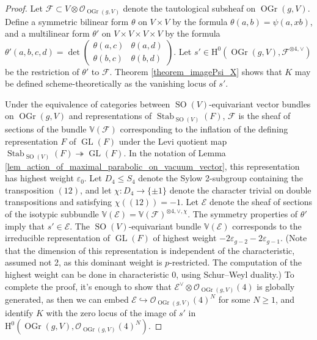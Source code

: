 \documentclass{article} %
\numberwithin{equation}{section}
\DeclareMathOperator{\GL}{GL}
\DeclareMathOperator{\SO}{SO}
\DeclareMathOperator{\Stab}{Stab}
\newcommand{\sh}[1]{\mathscr{#1}}
\renewcommand{\O}{\mathcal{O}}
\newcommand{\HH}{\mathrm{H}}
\newcommand{\cO}{\mathcal{O}}
\DeclareMathOperator{\OGr}{OGr}
\begin{document}
\begin{proof}
    Let $\sh{F}\subset V\otimes\O_{\OGr(g,V)}$ denote the tautological subsheaf on $\OGr(g, V)$. Define a symmetric bilinear form $\theta$ on $V \times V$ by the formula $\theta(a, b) = \psi(a, xb)$, and a multilinear form $\theta'$ on $V \times V \times V \times V$ by the formula $\theta'(a, b, c, d) = \det \left( \begin{smallmatrix} \theta(a, c) & \theta(a, d) \\ \theta(b, c) & \theta(b, d) \end{smallmatrix} \right)$. Let $s' \in \HH^0(\OGr(g,V),\sh{F}^{\otimes 4, \vee})$ be the restriction of $\theta'$ to $\sh{F}$.
    Theorem \ref{theorem_imagePsi_X} shows that $K$ may be defined scheme-theoretically as the vanishing locus of $s'$. 

    Under the equivalence of categories between $\SO(V)$-equivariant vector bundles on $\OGr(g,V)$ and representations of $\Stab_{\SO(V)}(F)$, $\sh{F}$ is the sheaf of sections of the bundle $\mathbb{V}(\sh{F})$ corresponding to the inflation of the defining representation $F$ of $\GL(F)$ under the Levi quotient map $\Stab_{\SO(V)}(F)\twoheadrightarrow \GL(F)$.
    In the notation of Lemma \ref{lem_action_of_maximal_parabolic_on_vacuum_vector}, this representation has highest weight $\varepsilon_0$.
    Let $D_4 \leq S_4$ denote the Sylow 2-subgroup containing the transposition $(12)$, and let $\chi : D_4 \to \{ \pm 1 \}$ denote the character trivial on double transpositions and satisfying $\chi((12)) = -1$. Let $\sh{E}$ denote the sheaf of sections of the isotypic subbundle $\mathbb{V}(\sh{E}) = \mathbb{V}(\sh{F})^{\otimes 4, \vee, \chi}$. 
    The symmetry properties of $\theta'$ imply that $s' \in \sh{E}$. The $\SO(V)$-equivariant bundle $\mathbb{V}(\sh{E})$ corresponds to the irreducible representation of $\GL(F)$ of highest weight $-2\varepsilon_{g-2} - 2\varepsilon_{g-1}$. (Note that the dimension of this representation is independent of the characteristic, assumed not 2, as this dominant weight is $p$-restricted. The computation of the highest weight can be done in characteristic 0, using Schur--Weyl duality.) To complete the proof, it's enough to show that $\sh{E}^\vee \otimes \cO_{\OGr(g, V)}(4)$ is globally generated, as then we can embed $\sh{E} \hookrightarrow \cO_{\OGr(g, V)}(4)^N$ for some $N \geq 1$, and identify $K$ with the zero locus of the image of $s'$ in $\HH^0( \OGr(g, V), \cO_{\OGr(g, V)}(4)^N)$. 
    

\end{proof}
\end{document}
